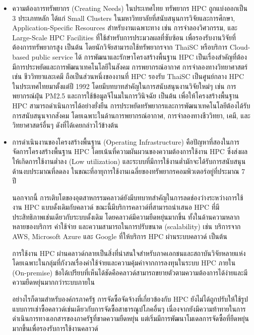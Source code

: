 \documentclass[a4paper,12pt]{extarticle}
\begin{document}
\begin{enumerate}
	\begin{itemize}
		\item ความต้องการทรัพยากร (Creating Needs) ในประเทศไทย ทรัพยากร HPC ถูกแบ่งออกเป็น 3 ประเภทหลัก ได้แก่ Small Clusters ในมหาวิทยาลัยที่สนับสนุนการวิจัยและการศึกษา, Application-Specific Resources สำหรับงานเฉพาะทาง เช่น การจำลองวิศวกรรม, และ Large-Scale HPC Facilities ที่ใช้สำหรับการประมวลผลที่ซับซ้อน เพื่อรองรับงานวิจัยที่ต้องการทรัพยากรสูง เป็นต้น โดยนักวิจัยสามารถใช้ทรัพยากรจาก ThaiSC หรือบริการ Cloud-based public service ได้ การพัฒนาและรักษาโครงสร้างพื้นฐาน HPC เป็นเรื่องสำคัญที่ต้องมีการประหยัดและการพัฒนาเทคโนโลยีในสังคม การพยากรณ์อากาศ การจำลองทางวิทยาศาสตร์ เช่น ชีววิทยาและเคมี ถือเป็นส่วนหนึ่งของงานที่ HPC รองรับ ThaiSC เป็นศูนย์กลาง HPC ในประเทศไทยมาตั้งแต่ปี 1992 โดยมีบทบาทสำคัญในการสนับสนุนงานวิจัยใหม่ๆ เช่น การพยากรณ์ฝุ่น PM2.5 และการใช้ข้อมูลจีโนมในการวินิจฉัย เป็นต้น เพื่อให้โครงสร้างพื้นฐาน HPC สามารถดำเนินการได้อย่างยั่งยืน การประหยัดทรัพยากรและการพัฒนาเทคโนโลยีต้องได้รับการสนับสนุนจากสังคม โดยเฉพาะในด้านการพยากรณ์อากาศ, การจำลองทางชีววิทยา, เคมี, และวิทยาศาสตร์อื่นๆ ดังที่ได้เคยกล่าวไว้ข้างต้น
		\item การดำเนินงานของโครงสร้างพื้นฐาน (Operating Infrastructure) คือปัญหาที่สองในการจัดการโครงสร้างพื้นฐาน HPC โดยเน้นที่ความผันผวนของความต้องการใช้งาน HPC ซึ่งส่งผลให้เกิดการใช้งานต่ำลง (Low utilization) และระบบที่มีการใช้งานต่ำมักจะได้รับการสนับสนุนด้านงบประมาณที่ลดลง ในขณะที่อายุการใช้งานเฉลี่ยของทรัพยากรคอมพิวเตอร์อยู่ที่ประมาณ 7 ปี

		นอกจากนี้ การเติบโตของอุตสาหกรรมคลาวด์ยังมีบทบาทสำคัญในการลดช่องว่างระหว่างการใช้งาน HPC แบบดั้งเดิมกับคลาวด์ ขณะนี้มีบริการคลาวด์ที่สามารถนำเสนอ HPC ที่มีประสิทธิภาพเช่นเดียวกับระบบดั้งเดิม โดยคลาวด์มีความยืดหยุ่นมากขึ้น ทั้งในด้านความหลากหลายของบริการ ค่าใช้จ่าย และความสามารถในการปรับขนาด (scalability) เช่น บริการจาก AWS, Microsoft Azure และ Google ที่ให้บริการ HPC ผ่านระบบคลาวด์ เป็นต้น

		การใช้งาน HPC ผ่านคลาวด์กลายเป็นสิ่งที่น่าสนใจสำหรับภาคเอกชนและสถาบันวิจัยหลายแห่ง โดยเฉพาะในกลุ่มที่กังวลเรื่องค่าใช้จ่ายและความคุ้มค่าจากการลงทุนในระบบ HPC ภายใน (On-premise) ข้อได้เปรียบที่เห็นได้ชัดคือคลาวด์สามารถขยายตัวตามความต้องการได้ง่ายและมีความยืดหยุ่นมากกว่าระบบภายใน

		อย่างไรก็ตามสำหรับองค์กรภาครัฐ การจัดซื้อจัดจ้างที่เกี่ยวข้องกับ HPC ยังไม่ได้ถูกปรับให้ใช้รูปแบบการเช่าซื้อคลาวด์เช่นเดียวกับการจัดซื้อสาธารณูปโภคอื่นๆ เนื่องจากยังมีความท้าทายในการดำเนินการทางเอกสารของภาครัฐที่ขาดความยืดหยุ่น แต่เริ่มมีการพัฒนาโมเดลการจัดซื้อที่ยืดหยุ่นมากขึ้นเพื่อรองรับการใช้งานคลาวด์


\end{itemize}
\end{enumerate}
\end{document}

